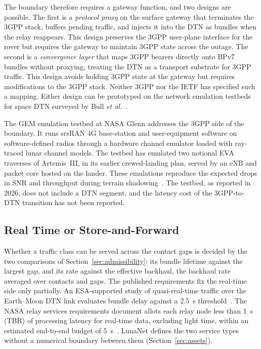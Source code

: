 \documentclass{IEEEoj}
\begin{document}
The boundary therefore requires a gateway function, and two designs are possible. The first is a \emph{protocol proxy} on the surface gateway that terminates the 3GPP stack, buffers pending traffic, and injects it into the DTN as bundles when the relay reappears. This design preserves the 3GPP user-plane interface for the rover but requires the gateway to maintain 3GPP state across the outage. The second is a \emph{convergence layer} that maps 3GPP bearers directly onto BPv7 bundles without proxying, treating the DTN as a transport substrate for 3GPP traffic. This design avoids holding 3GPP state at the gateway but requires modifications to the 3GPP stack. Neither 3GPP nor the IETF has specified such a mapping. Either design can be prototyped on the network emulation testbeds for space DTN surveyed by Bull \emph{et al.}~\cite{perreault_testbed}.

The GEM emulation testbed at NASA Glenn addresses the 3GPP side of the boundary. It runs srsRAN 4G base-station and user-equipment software on software-defined radios through a hardware channel emulator loaded with ray-traced lunar channel models. The testbed has emulated two notional EVA traverses of Artemis~III, in its earlier crewed-landing plan, served by an eNB and packet core hosted on the lander. These emulations reproduce the expected drops in SNR and throughput during terrain shadowing~\cite{nasa_gem_2026}. The testbed, as reported in 2026, does not include a DTN segment, and the latency cost of the 3GPP-to-DTN transition has not been reported.

\subsection{Real Time or Store-and-Forward}
Whether a traffic class can be served across the contact gaps is decided by the two comparisons of Section~\ref{sec:admissibility}: its bundle lifetime against the largest gap, and its rate against the effective backhaul, the backhaul rate averaged over contacts and gaps. The published requirements fix the real-time side only partially. An ESA-supported study of quasi-real-time traffic over the Earth--Moon DTN link evaluates bundle delay against a \SI{2.5}{\second} threshold~\cite{ulierte_traffic_prio}. The NASA relay services requirements document allots each relay node less than \SI{1}{\second} (TBR) of processing latency for real-time data, excluding light time, within an estimated end-to-end budget of \SI{5}{\second}~\cite{nasa_lunar_relay_srd}. LunaNet defines the two service types without a numerical boundary between them (Section~\ref{sec:assets}).
\end{document}
